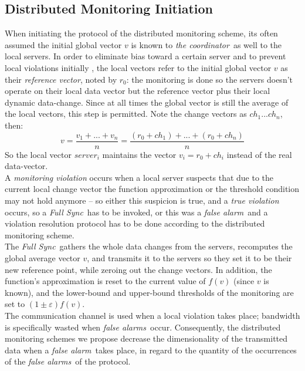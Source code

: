 \documentclass[10pt, conference]{IEEEtran}
\newcommand{\fullSync}{\textit{Full Sync}}
\newcommand{\falseAlarm}{\textit{false alarm}}
\newcommand{\falseAlarms}{\textit{false alarms}}
\newcommand{\theCoordinator}{\textit{the coordinator}}
\begin{document}
\subsection{Distributed Monitoring Initiation}
When initiating the protocol of the distributed monitoring scheme, its often assumed the initial global vector $v$ is known to \theCoordinator \ as well to the local servers. In order to eliminate bias toward a certain server and to prevent local violations initially \cite{sharfman2007geometric},  the local vectors refer to the initial global vector $v$ as their \textit{reference vector}, noted by $r_0$: the monitoring is done so the servers doesn't operate on their local data vector but the reference vector plus their local dynamic data-change. Since at all times the global vector is still the average of the local vectors, this step is permitted. Note the change vectors as ${ch_1 ... ch_n}$, then: \\
\begin{equation}
v = \frac{v_1+...+ v_n}{n} = \frac{(r_0+ch_1)+...+(r_0+ch_n)}{n}
\end{equation}
So the local vector $server_i$ maintains the vector $v_i = r_0 + ch_i$ instead of the real data-vector. \\
A \textit{monitoring violation} occurs when a local server suspects that due to the current local change vector the function approximation or the threshold condition may not hold anymore -- so either this suspicion is true, and a \textit{true violation} occurs, so a \fullSync \ has to be invoked, or this was a \falseAlarm \ and a violation resolution protocol has to be done according to the distributed monitoring scheme. \\
The \fullSync \ gathers the whole data changes from the servers, recomputes the global average vector $v$, and transmits it to the servers so they set it to be their new reference point, while zeroing out the change vectors. In addition, the function's approximation is reset to the current value of $f(v)$ (since $v$ is known), and the lower-bound and upper-bound thresholds of the monitoring are set to ${(1 \pm \varepsilon )f(v)}$. \\
The communication channel is used when a local violation takes place; bandwidth is specifically wasted when \falseAlarms \ occur. Consequently, the distributed monitoring schemes we propose decrease the dimensionality of the transmitted data when a \falseAlarm \ takes place, in regard to the quantity of the occurrences of the \falseAlarms \ of the protocol.
\end{document}
